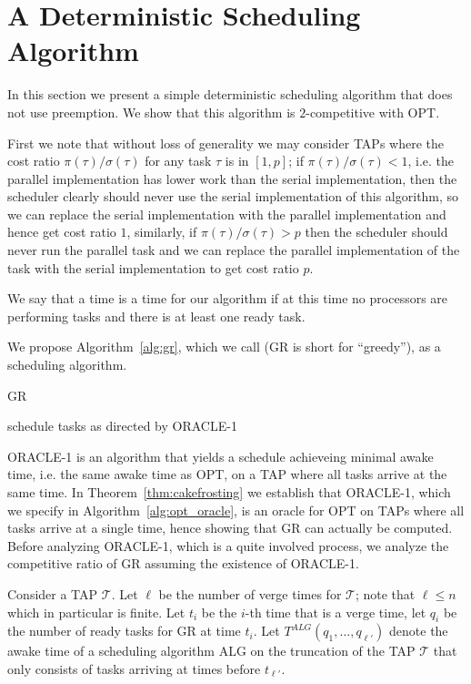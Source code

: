 \section{A Deterministic Scheduling Algorithm}
In this section we present a simple deterministic scheduling
algorithm that does not use preemption. We show that this
algorithm is $2$-competitive with OPT.

First we note that without loss of generality we may consider
TAPs where the cost ratio $\pi(\tau)/\sigma(\tau)$ for any task
$\tau$ is in $[1,p]$; if $\pi(\tau)/\sigma(\tau) < 1$, i.e. the
parallel implementation has lower work than the serial
implementation, then the scheduler clearly should never use the
serial implementation of this algorithm, so we can replace the
serial implementation with the parallel implementation and hence
get cost ratio $1$, similarly, if $\pi(\tau)/\sigma(\tau) > p$
then the scheduler should never run the parallel task and we can
replace the parallel implementation of the task with the serial
implementation to get cost ratio $p$.

We say that a time is a  time for our algorithm if at
this time no processors are performing tasks and there is at
least one ready task.

We propose Algorithm~\ref{alg:gr}, which we call 
(GR is short for \enquote{greedy}), as a scheduling algorithm.

\begin{algorithm}
  \caption{GR}
  \label{alg:gr}
  \begin{algorithmic}
        \State schedule tasks as directed by ORACLE-1 
      \EndIf
    \EndWhile
  \end{algorithmic}
\end{algorithm}

ORACLE-1 is an algorithm that yields a schedule achieveing
minimal awake time, i.e. the same awake time as OPT, on a TAP
where all tasks arrive at the same time. In
Theorem~\ref{thm:cakefrosting} we establish that ORACLE-1, which
we specify in Algorithm~\ref{alg:opt_oracle}, is an oracle for
OPT on TAPs where all tasks arrive at a single time, hence
showing that GR can actually be computed. Before analyzing
ORACLE-1, which is a quite involved process, we analyze the
competitive ratio of GR assuming the existence of ORACLE-1. 

Consider a TAP $\mathcal{T}$. Let $\ell$ be the number of verge
times for $\mathcal{T}$; note that $\ell \le n$ which in
particular is finite. Let $t_i$ be the $i$-th time that is a
verge time, let $q_i$ be the number of ready tasks for GR at
time $t_i$. Let $T^{ALG}(q_1, \ldots, q_{\ell'})$ denote the
awake time of a scheduling algorithm ALG on the truncation of the
TAP $\mathcal{T}$ that only consists of tasks arriving at times
before $t_{\ell'}$.

